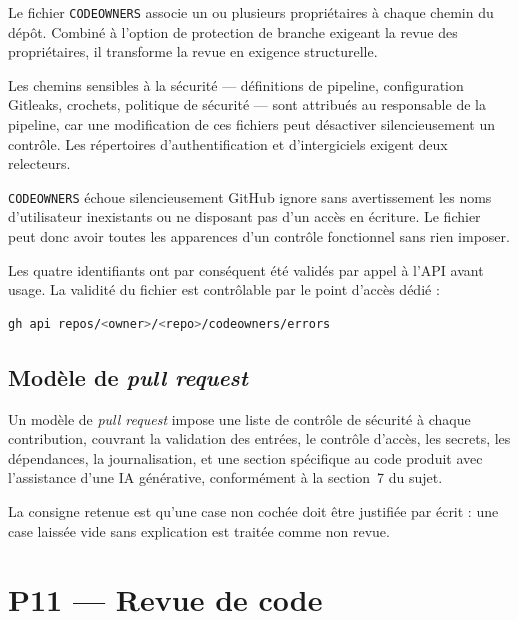 Le fichier \texttt{CODEOWNERS} associe un ou plusieurs propriétaires à chaque
chemin du dépôt. Combiné à l'option de protection de branche exigeant la revue
des propriétaires, il transforme la revue en exigence structurelle.

Les chemins sensibles à la sécurité --- définitions de pipeline, configuration
Gitleaks, crochets, politique de sécurité --- sont attribués au responsable de
la pipeline, car une modification de ces fichiers peut désactiver silencieusement
un contrôle. Les répertoires d'authentification et d'intergiciels exigent deux
relecteurs.

\begin{constat}{\texttt{CODEOWNERS} échoue silencieusement}
GitHub ignore sans avertissement les noms d'utilisateur inexistants ou ne
disposant pas d'un accès en écriture. Le fichier peut donc avoir toutes les
apparences d'un contrôle fonctionnel sans rien imposer.

Les quatre identifiants ont par conséquent été validés par appel à l'API avant
usage. La validité du fichier est contrôlable par le point d'accès dédié :

\begin{lstlisting}[language=bash,numbers=none]
gh api repos/<owner>/<repo>/codeowners/errors
\end{lstlisting}
\end{constat}

\subsection{Modèle de \emph{pull request}}

Un modèle de \emph{pull request} impose une liste de contrôle de sécurité à
chaque contribution, couvrant la validation des entrées, le contrôle d'accès,
les secrets, les dépendances, la journalisation, et une section spécifique au
code produit avec l'assistance d'une IA générative, conformément à la
section~7 du sujet.

La consigne retenue est qu'une case non cochée doit être justifiée par écrit :
une case laissée vide sans explication est traitée comme non revue.


\section{P11 --- Revue de code}
\label{sec:revue-code}

